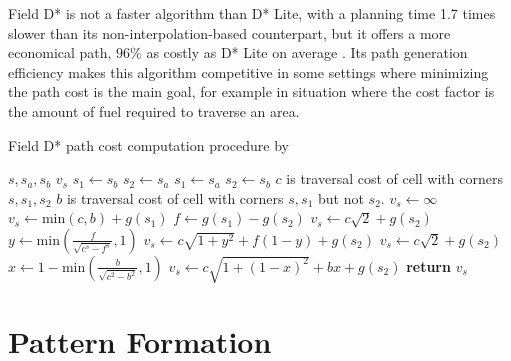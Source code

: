 Field D* is not a faster algorithm than D* Lite, with a planning time 1.7 times slower than its non-interpolation-based counterpart, 
but it offers a more economical path, $96\%$ as costly as D* Lite on average \autocite{DF06}. Its path generation efficiency makes
this algorithm competitive in some settings where minimizing the path cost is the main goal, for example in situation where the 
cost factor is the amount of fuel required to traverse an area.

\begin{algorithm}
	\algrenewcommand{}
	\algrenewcommand{}
	\caption{Field D* path cost computation procedure by \autocite{DF06}}\label{alg:fds-cc}
	\begin{algorithmic}[1]
		\Require $s, s_a, s_b$
		\Ensure $v_s$ 
		\State $s_1 \gets s_b$ 
		\State $s_2 \gets s_a$
		\Else
		\State $s_1 \gets s_a$ 
		\State $s_2 \gets s_b$ 
		\EndIf
		\State $c$ is traversal cost of cell with corners $s, s_1, s_2$ 
		\State $b$ is traversal cost of cell with corners $s, s_1$ but not $s_2$.
		\State $v_s \gets \infty$
		\State $v_s \gets \mathrm{min}(c,b) + g(s_1)$
		\Else
		\State $f \gets g(s_1) - g(s_2)$ 
		\State $v_s \gets c \sqrt{2} + g(s_2)$
		\Else
		\State $y \gets \mathrm{min}\left(\frac{f}{\sqrt{c^s - f^s}}, 1\right)$
		\State $v_s \gets c \sqrt{1 + y^2} + f(1 - y) + g(s_2)$
		\EndIf
		\Else
		\State $v_s \gets c \sqrt{2} + g(s_2)$
		\Else 
		\State $x \gets 1 - \mathrm{min}\left(\frac{b}{\sqrt{c^2 - b^2}},1\right)$
		\State $v_s \gets c \sqrt{1 + (1-x)^2} + bx + g(s_2)$
		\EndIf
		\EndIf
		\EndIf
		\State \textbf{return} $v_s$
	\end{algorithmic}
\end{algorithm}




\section{Pattern Formation}



\printbibliography

